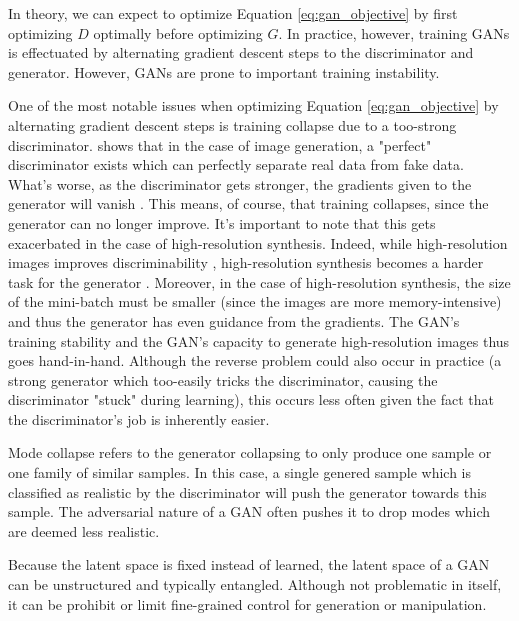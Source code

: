 In theory, we can expect to optimize Equation \ref{eq:gan_objective} by first optimizing $D$ 
optimally before optimizing $G$. In practice, however, training \ac{GAN}s is effectuated 
by alternating gradient descent steps to the discriminator and generator. 
However, GANs are prone to important training 
instability. 

One of the most notable issues when optimizing Equation \ref{eq:gan_objective} by alternating 
gradient descent steps is training collapse due to a too-strong discriminator. \cite{arjovsky2017towards}
shows that in the case of image generation, a "perfect" discriminator exists which can perfectly 
separate real data from fake data. What's worse, as the discriminator gets stronger, 
 the gradients  given to the generator will vanish \citep{arjovsky2017towards}. 
 This means, of course, that training collapses, since the generator can no longer improve. 
 It's important to note that this gets exacerbated in the case of high-resolution synthesis. 
 Indeed, while high-resolution images improves discriminability \citep{pmlr-v70-odena17a}, high-resolution 
 synthesis becomes a harder task for the generator \citep{karras2018progressive}. Moreover, in the case of 
 high-resolution synthesis, the size of the mini-batch must be smaller (since the images are more memory-intensive)
 and thus the generator has even guidance from the gradients. The \ac{GAN}'s training stability 
and the \ac{GAN}'s capacity to generate high-resolution images thus goes hand-in-hand. Although the 
reverse problem could also occur in practice (a strong generator which too-easily tricks the discriminator, causing 
the discriminator "stuck" during learning), 
this occurs less often given the fact that the discriminator's job is inherently easier.

 Mode collapse refers to the generator collapsing to only produce one sample or one family of
similar samples. In this case, a single genered sample which is classified as realistic by the discriminator will 
push the generator towards this sample. The adversarial nature of a \ac{GAN} often pushes it to drop modes which are 
deemed less realistic.

Because the latent space is fixed instead of learned, the latent space of a GAN can be unstructured 
and typically entangled. Although not problematic in itself, it can be prohibit or limit 
fine-grained control for generation or manipulation.

